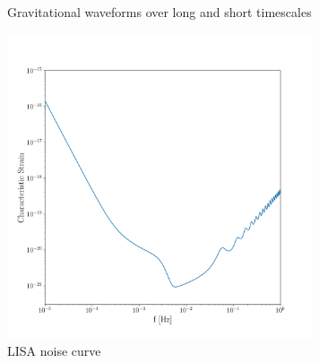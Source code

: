 \documentclass[a4paper,fleqn,usenatbib]{mnras}
\begin{document}
\begin{figure}
	 \\
	 \\
	\medskip
	\caption{Gravitational waveforms over long and short timescales}
	\label{fig:waveforms}
\end{figure}


\begin{figure}
	\includegraphics[width=0.8\textwidth]{LISANoise.png}
	\caption{LISA noise curve}
	\label{fig:noise}
\end{figure}






\bsp	%
\label{lastpage}
\end{document}
